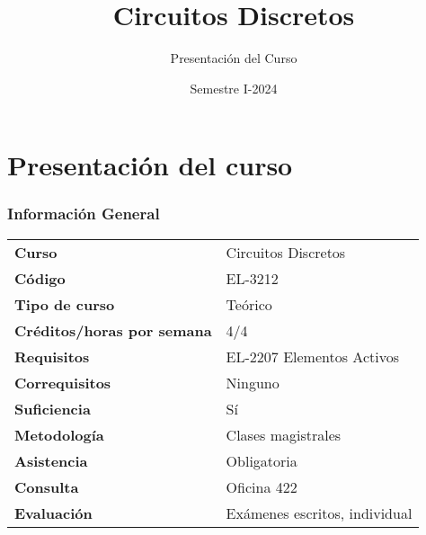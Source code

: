 \title[Circuitos Discretos]{Circuitos Discretos}
\subtitle{Presentación del Curso}
\date{Semestre I-2024}

\section{Presentación del curso}

\begin{frame}[t]
\titlepage
\end{frame}

\begin{frame}[t]
\frametitle{Información General}

\begin{table}
	\centering %
	\begin{tabular}{ll}
	\textbf{Curso} & Circuitos Discretos \\
	\textbf{Código} & EL-3212 \\
	\textbf{Tipo de curso} & Teórico \\
	\textbf{Créditos/horas por semana} & 4/4 \\
	\textbf{Requisitos} & EL-2207 Elementos Activos \\
	\textbf{Correquisitos} & Ninguno \\
	\textbf{Suficiencia} & Sí \\
	\textbf{Metodología} & Clases magistrales \\
	\textbf{Asistencia} & Obligatoria \\
	\textbf{Consulta} & Oficina 422 \\
	\textbf{Evaluación} & Exámenes escritos, individual \\
	\end{tabular}
\end{table}
\end{frame}


